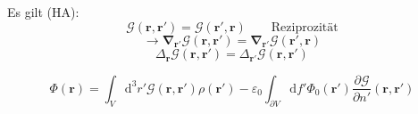 \documentclass[titlepage,11pt,a4paper,ngerman]{report}
\newcommand{\tx}[1]{\textrm{#1}}
\newcommand{\dd}{\tx{d}}
\newcommand{\gre}{\mathcal{G}}
\renewcommand{\Phi}{\varPhi}
\renewcommand{\vec}[1]{\boldsymbol{#1}}
\renewcommand{\epsilon}{\varepsilon}
\newcommand{\rbox}[1]{\begin{tcolorbox}[colback=white,colframe=red!75!black]#1\end{tcolorbox}}
\begin{document}
Es gilt (HA):
\begin{equation*}
\gre(\vec{r},\vec{r}') = \gre(\vec{r}',\vec{r}) \qquad \tx{Reziprozität}
\end{equation*}
\begin{equation*}
\rightarrow \vec{\nabla}_{\vec{r}'} \gre(\vec{r},\vec{r}') = \vec{\nabla}_{\vec{r}'} \gre(\vec{r}',\vec{r})
\end{equation*}
\begin{equation*}
\Delta_{\vec{r}} \gre(\vec{r},\vec{r}') = \Delta_{\vec{r}'} \gre(\vec{r},\vec{r}')
\end{equation*}

\rbox{\begin{equation*}
\Phi(\vec{r}) = \int_V \dd^3 r' \gre(\vec{r},\vec{r}') \rho(\vec{r}') - \epsilon_0 \int_{\partial V} \dd f' \Phi_0(\vec{r}') \frac{\partial \gre}{\partial n'} (\vec{r},\vec{r}')
\end{equation*}}



\end{document}
